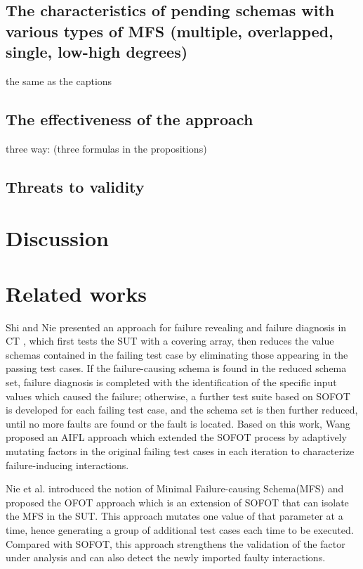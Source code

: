 {\subsection{The characteristics of pending schemas with various types of MFS (multiple, overlapped, single, low-high degrees)}

the same as the captions


\subsection{The effectiveness of the approach}

three way: (three formulas in the propositions)


\subsection{Threats to validity}


\section{Discussion}\label{sec:discussion}


\section{Related works}\label{sec:related}
Shi and Nie \cite{shi2005software} presented an approach for failure revealing and failure diagnosis in CT , which first tests the SUT with a covering array, then reduces the value schemas contained in the failing test case by eliminating those appearing in the passing test cases. If the failure-causing schema is found in the reduced schema set, failure diagnosis is completed with the identification of the specific input values which caused the failure; otherwise, a further test suite based on SOFOT is developed for each failing test case, and the schema set is then further reduced, until no more faults are found or the fault is located. Based on this work, Wang \cite{wang2010adaptive} proposed an AIFL approach which extended the SOFOT process by adaptively mutating factors in the original failing test cases in each iteration to characterize failure-inducing interactions.

Nie et al. \cite{nie2011minimal} introduced the notion of Minimal Failure-causing Schema(MFS) and proposed the OFOT approach which is an extension of SOFOT that can isolate the MFS in the SUT. This approach mutates one value of that parameter at a time, hence generating a group of additional test cases each time to be executed. Compared with SOFOT, this approach  strengthens the validation of the factor under analysis and can also detect the newly imported faulty interactions.

}
